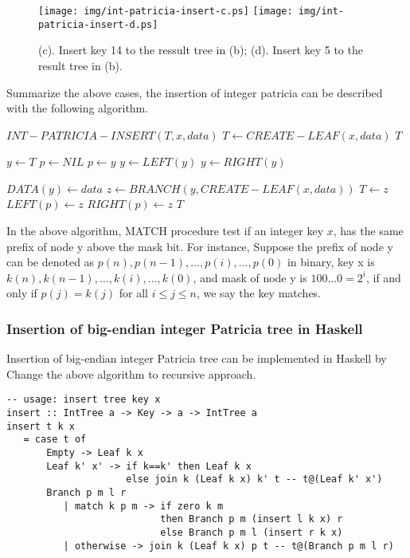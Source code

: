 \documentclass{article}
\begin{document}
\begin{figure}[htbp]
       \begin{center}
	\texttt{[image: img/int-patricia-insert-c.ps]}
	\texttt{[image: img/int-patricia-insert-d.ps]}
        \caption{(c). Insert key 14 to the ressult tree in (b);
	(d). Insert key 5 to the result tree in (b).}
        \label{fig:int-patricia-insert-c}
       \end{center}
\end{figure}

Summarize the above cases, the insertion of integer patricia can be described
with the following algorithm.

\begin{algorithmic}
\STATE $INT-PATRICIA-INSERT(T, x, data)$
   \STATE $T \leftarrow CREATE-LEAF(x, data)$
   \RETURN $T$
\ENDIF

\STATE $y \leftarrow T$
\STATE $p \leftarrow NIL$
  \STATE $p \leftarrow y$
    \STATE $y \leftarrow LEFT(y)$
  \ELSE
    \STATE $y \leftarrow RIGHT(y)$
  \ENDIF
\ENDWHILE

  \STATE $DATA(y) \leftarrow data$ 
\ELSE
  \STATE $z \leftarrow BRANCH(y, CREATE-LEAF(x, data))$
    \STATE $T \leftarrow z$
  \ELSE
      \STATE $LEFT(p) \leftarrow z$
    \ELSE
      \STATE $RIGHT(p) \leftarrow z$
    \ENDIF
  \ENDIF
\ENDIF
\RETURN $T$
\end{algorithmic}

In the above algorithm, MATCH procedure test if an integer key $x$, has 
the same prefix of node y above the mask bit. For instance,
Suppose the prefix of node y can be denoted as 
$p(n), p(n-1), ..., p(i), ..., p(0)$ in binary, key x is
$k(n), k(n-1), ..., k(i), ..., k(0)$, and mask of node y is 
$100...0=2^i$, if and only if $p(j)=k(j)$ for all $i \leq j \leq n$, 
we say the key matches.

\subsubsection*{Insertion of big-endian integer Patricia tree in Haskell}
Insertion of big-endian integer Patricia tree can be implemented in Haskell
by Change the above algorithm to recursive approach.

\lstset{language=Haskell}
\begin{lstlisting}
-- usage: insert tree key x
insert :: IntTree a -> Key -> a -> IntTree a
insert t k x 
   = case t of
       Empty -> Leaf k x
       Leaf k' x' -> if k==k' then Leaf k x
                     else join k (Leaf k x) k' t -- t@(Leaf k' x')
       Branch p m l r
          | match k p m -> if zero k m
                           then Branch p m (insert l k x) r
                           else Branch p m l (insert r k x)
          | otherwise -> join k (Leaf k x) p t -- t@(Branch p m l r)
\end{lstlisting}
\end{document}
